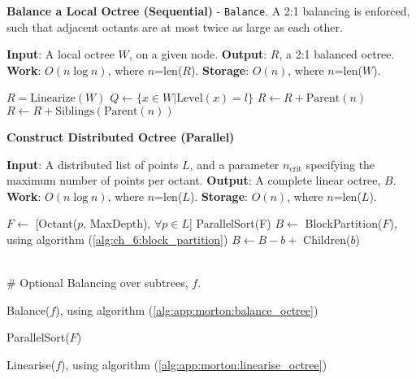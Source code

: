 \begin{algorithm}
    \caption{\textbf{Balance a Local Octree (Sequential)} - \texttt{Balance}. A 2:1 balancing is enforced, such that adjacent octants are at most twice as large as each other.}
    \label{alg:app:morton:balance_octree}
    \begin{algorithmic}
        \STATE \textbf{Input}: A local octree $W$, on a given node.
        \STATE \textbf{Output}: $R$, a 2:1 balanced octree.
        \STATE \textbf{Work}: $O(n \log n)$, where $n$=len($R$).
        \STATE \textbf{Storage}: $O(n)$, where $n$=len($W$).

        \STATE $R = \text{Linearize}(W)$
            \STATE $Q \gets \{ x \in W | \text{Level}(x) = l \}$
                        \STATE $R \gets R + \text{Parent}(n)$
                        \STATE $R \gets R + \text{Siblings}(\text{Parent}(n))$
                    \ENDIF
                \ENDFOR
            \ENDFOR
        \ENDFOR
    \end{algorithmic}
\end{algorithm}

\begin{algorithm}
    \caption{\textbf{Construct Distributed Octree (Parallel)}}
    \label{alg:app:morton:point2octree}
    \begin{algorithmic}
        \STATE \textbf{Input}: A distributed list of points $L$, and a parameter $n_{\text{crit}}$ specifying the maximum number of points per octant.
        \STATE \textbf{Output}: A complete linear octree, $B$.
        \STATE \textbf{Work}: $O(n \log n)$, where $n$=len($L$).
        \STATE \textbf{Storage}: $O(n)$, where $n$=len($L$).

        \STATE $F \gets $ [Octant($p$, MaxDepth), $\forall p \in L$]
        \STATE ParallelSort(F)
        \STATE $B \gets $ BlockPartition($F$), using algorithm (\ref{alg:ch_6:block_partition})
                \STATE $B \gets B - b + $ Children($b$)
            \ENDIF
        \ENDFOR

        \STATE \\\# Optional Balancing over subtrees, $f$.

                \STATE Balance($f$), using algorithm (\ref{alg:app:morton:balance_octree})
            \ENDFOR

            \STATE ParallelSort($F$)

                \STATE Linearise($f$), using algorithm (\ref{alg:app:morton:linearise_octree})
            \ENDFOR
        \ENDIF

    \end{algorithmic}
\end{algorithm}


